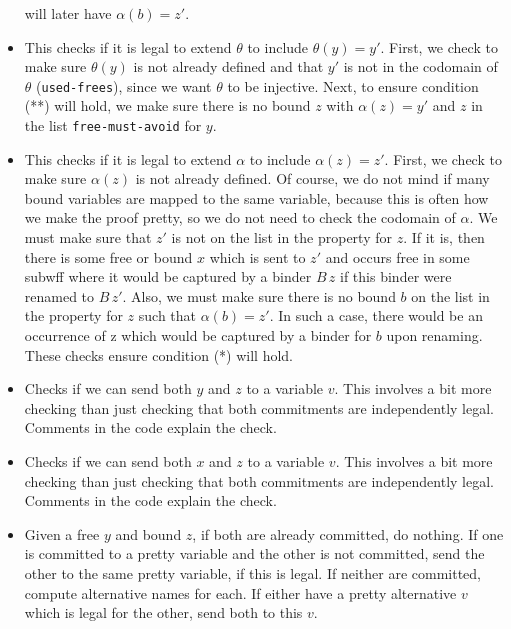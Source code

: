 \begin{itemize}
will later have $\alpha(b) = z'$.
\item {\bf {}}  This checks if it is legal to extend $\theta$ to include $\theta(y) = y'$.
First, we check to make sure $\theta(y)$ is not already defined and that $y'$ is not in the codomain of $\theta$ (\verb+used-frees+),
since we want $\theta$ to be injective.  Next, to ensure condition (**) will hold, we make sure there is
no bound $z$ with $\alpha(z) = y'$ and $z$ in the list \verb+free-must-avoid+ for $y$.
\item {\bf {}}  This checks if it is legal to extend $\alpha$ to include $\alpha(z) = z'$.
First, we check to make sure $\alpha(z)$ is not already defined.  Of course, we do not mind if many bound variables
are mapped to the same variable, because this is often how we make the proof pretty, so we do not need to check the codomain
of $\alpha$.  We must make sure that $z'$ is not on the list in the property {\tt {}} for $z$.
If it is, then there is some free or bound $x$ which is sent to $z'$ and occurs free in some subwff where it would be captured
by a binder $B \, z$ if this binder were renamed to $B \, z'$.  Also, we must make sure there is no bound $b$ on the
list in the property {\tt {}} for $z$ such that $\alpha(b) = z'$.  In such a case,
there would be an occurrence of z which would be captured by a binder for $b$ upon renaming.
These checks ensure condition (*) will hold.
\item {\bf {}}  Checks if we can send both $y$ and $z$ to a variable $v$.
This involves a bit more checking than just checking that both commitments are independently legal.  Comments
in the code explain the check.
\item {\bf {}}  Checks if we can send both $x$ and $z$ to a variable $v$.
This involves a bit more checking than just checking that both commitments are independently legal.  Comments
in the code explain the check.
\item {\bf {}}  Given a free $y$ and bound $z$, if both are already committed,
do nothing.  If one is committed to a pretty variable and the other is not committed, send the other to the same pretty
variable, if this is legal.  If neither are committed, compute alternative names for each.  If either have a pretty alternative $v$
which is legal for the other, send both to this $v$.

\end{itemize}
